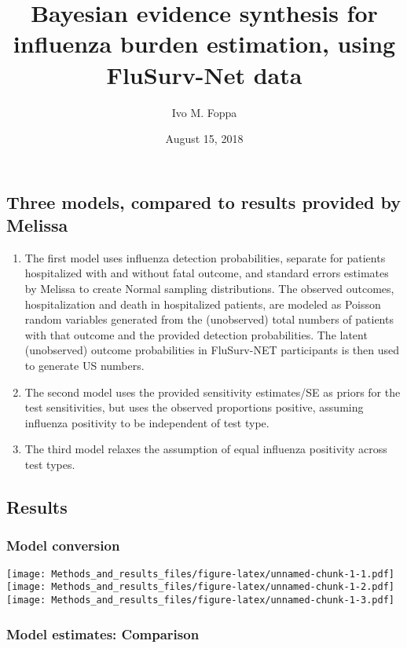 \documentclass[]{article}
\title{Bayesian evidence synthesis for influenza burden estimation, using
FluSurv-Net data}
\author{Ivo M. Foppa}
\date{August 15, 2018}
\providecommand{\tightlist}{%
  \setlength{\itemsep}{0pt}\setlength{\parskip}{0pt}}
\begin{document}
\maketitle

\subsection{Three models, compared to results provided by
Melissa}\label{three-models-compared-to-results-provided-by-melissa}

\begin{enumerate}
\def\labelenumi{\arabic{enumi}.}
\tightlist
\item
  The first model uses influenza detection probabilities, separate for
  patients hospitalized with and without fatal outcome, and standard
  errors estimates by Melissa to create Normal sampling distributions.
  The observed outcomes, hospitalization and death in hospitalized
  patients, are modeled as Poisson random variables generated from the
  (unobserved) total numbers of patients with that outcome and the
  provided detection probabilities. The latent (unobserved) outcome
  probabilities in FluSurv-NET participants is then used to generate US
  numbers.
\item
  The second model uses the provided sensitivity estimates/SE as priors
  for the test sensitivities, but uses the observed proportions
  positive, assuming influenza positivity to be independent of test
  type.
\item
  The third model relaxes the assumption of equal influenza positivity
  across test types.
\end{enumerate}

\subsection{Results}\label{results}

\subsubsection{Model conversion}\label{model-conversion}

\texttt{[image: Methods\_and\_results\_files/figure-latex/unnamed-chunk-1-1.pdf]}
\texttt{[image: Methods\_and\_results\_files/figure-latex/unnamed-chunk-1-2.pdf]}
\texttt{[image: Methods\_and\_results\_files/figure-latex/unnamed-chunk-1-3.pdf]}

\subsubsection{Model estimates:
Comparison}\label{model-estimates-comparison}
\end{document}
